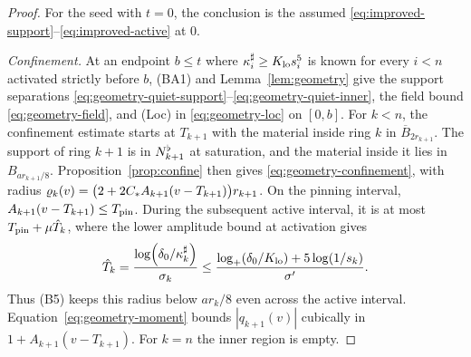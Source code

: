 \begin{proof}
For the seed with $t=0$, the conclusion is the assumed
\eqref{eq:improved-support}--\eqref{eq:improved-active} at $0$.

\label{par:relay-geometry}
\emph{Confinement.}
At an endpoint $b\le t$ where $\kappa^\sharp_i\ge K_{\mathrm{lo}} s_i^5$ is known for every
$i<n$ activated strictly before $b$, (BA1) and Lemma~\ref{lem:geometry}
give the support separations
\eqref{eq:geometry-quiet-support}--\eqref{eq:geometry-quiet-inner}, the
field bound \eqref{eq:geometry-field}, and (Loc) in
\eqref{eq:geometry-loc} on $[0,b]$. For $k<n$, the confinement estimate starts
at $T_{k+1}$ with the material inside ring $k$ in
$\overline B_{2r_{k+1}}$. The support of ring $k+1$ is in $N^{\flat}_{k+1}$ at
saturation, and the material inside it lies in $B_{ar_{k+1}/8}$.
Proposition~\ref{prop:confine} then gives \eqref{eq:geometry-confinement},
with radius $\varrho_k(v)=\big(2+2C_{*} A_{k+1}(v-T_{k+1})\big)r_{k+1}$.
On the pinning interval, $A_{k+1}(v-T_{k+1})\le T_{\mathrm{pin}}$. During the subsequent
active interval, it is at most $T_{\mathrm{pin}}+\mu\hat T_k$, where the lower amplitude
bound at activation gives
\begin{equation}
\label{eq:relay-duration}
\hat T_k=\frac{\log(\delta_0/\kappa^\sharp_k)}{\sigma_k}
\le\frac{\log_+(\delta_0/K_{\mathrm{lo}})+5\log(1/s_k)}{\sigma'}.
\end{equation}
Thus (B5) keeps this radius below $ar_k/8$ even across the active interval.
Equation~\eqref{eq:geometry-moment} bounds $|q_{k+1}(v)|$ cubically in
$1+A_{k+1}(v-T_{k+1})$. For $k=n$ the inner region is empty.


\end{proof}
